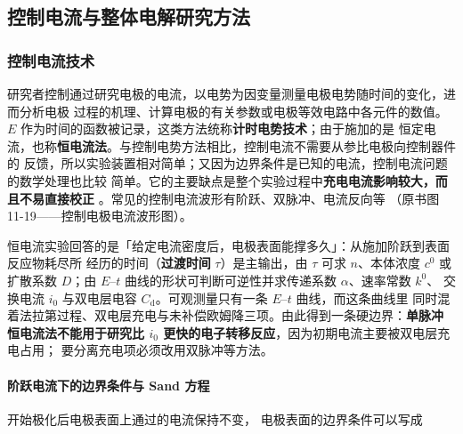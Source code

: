 
\subsection{控制电流与整体电解研究方法}

\subsubsection{控制电流技术}

研究者控制通过研究电极的电流，以电势为因变量测量电极电势随时间的变化，进而分析电极
过程的机理、计算电极的有关参数或电极等效电路中各元件的数值。$E$ 作为时间的函数被记录，这类方法统称\textbf{计时电势技术}；由于施加的是
恒定电流，也称\textbf{恒电流法}。与控制电势方法相比，控制电流不需要从参比电极向控制器件的
反馈，所以实验装置相对简单；又因为边界条件是已知的电流，控制电流问题的数学处理也比较
简单。它的主要缺点是整个实验过程中\textbf{充电电流影响较大，而且不易直接校正}
。常见的控制电流波形有阶跃、双脉冲、电流反向等
（原书图 11-19——控制电极电流波形图）。

\begin{probout}
恒电流实验回答的是「给定电流密度后，电极表面能撑多久」：从施加阶跃到表面反应物耗尽所
经历的时间（\textbf{过渡时间} $\tau$）是主输出，由 $\tau$ 可求 $n$、本体浓度 $c^0$ 或
扩散系数 $D$；由 $E$–$t$ 曲线的形状可判断可逆性并求传递系数 $\alpha$、速率常数 $k^0$、
交换电流 $i_0$ 与双电层电容 $C_{\mathrm{d}}$。可观测量只有一条 $E$–$t$ 曲线，而这条曲线里
同时混着法拉第过程、双电层充电与未补偿欧姆降三项。由此得到一条硬边界：\textbf{单脉冲
恒电流法不能用于研究比 $i_0$ 更快的电子转移反应}，因为初期电流主要被双电层充电占用；
要分离充电项必须改用双脉冲等方法。
\end{probout}

\paragraph{阶跃电流下的边界条件与 Sand 方程} 开始极化后电极表面上通过的电流保持不变，
电极表面的边界条件可以写成

